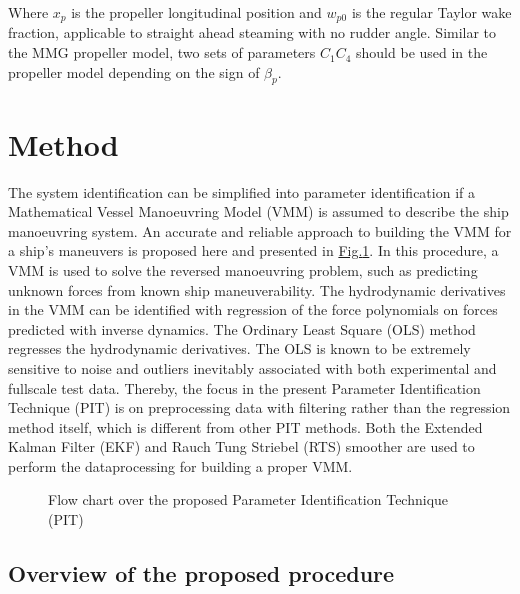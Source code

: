 \documentclass[review]{elsarticle}
\let\sphinxpxdimen\pdfpxdimen\else\newdimen\sphinxpxdimen
\begin{document}
Where \(x_p\) is the propeller longitudinal position and \(w_{p0}\) is the regular Taylor wake fraction, applicable to straight ahead steaming with no rudder angle. Similar to the MMG propeller model, two sets of parameters \(C_1\)\sphinxhyphen{}\(C_4\) should be used in the propeller model depending on the sign of \(\beta_p\).


\section{Method}
\label{\detokenize{01.01_method:method}}\label{\detokenize{01.01_method:id1}}\label{\detokenize{01.01_method::doc}}
  
The system identification can be simplified into parameter identification if a Mathematical Vessel Manoeuvring Model (VMM) is assumed to describe the ship manoeuvring system. An accurate and reliable approach to building the VMM for a ship’s maneuvers is proposed here and presented in \hyperref[\detokenize{01.01_method:overview}]{Fig.\@ \ref{\detokenize{01.01_method:overview}}}.
In this procedure, a VMM is used to solve the reversed manoeuvring problem, such as predicting unknown forces from known ship maneuverability. The hydrodynamic derivatives in the VMM can be identified with regression of the force polynomials on forces predicted with inverse dynamics. The Ordinary Least Square (OLS) method regresses the hydrodynamic derivatives. The OLS is known to be extremely sensitive to noise and outliers inevitably associated with both experimental and full\sphinxhyphen{}scale test data. Thereby, the focus in the present Parameter Identification Technique (PIT) is on pre\sphinxhyphen{}processing data with filtering rather than the regression method itself, which is different from other PIT methods. Both the Extended Kalman Filter (EKF) and Rauch Tung Striebel (RTS) smoother are used to perform the data\sphinxhyphen{}processing for building a proper VMM.

\begin{figure}[H]
\centering
\capstart

\noindent\sphinxincludegraphics[width=500\sphinxpxdimen]{{method}.png}
\caption{Flow chart over the proposed Parameter Identification Technique (PIT)}\label{\detokenize{01.01_method:overview}}\end{figure}


\subsection{Overview of the proposed procedure}
\label{\detokenize{01.01_method:overview-of-the-proposed-procedure}}
  
\end{document}
